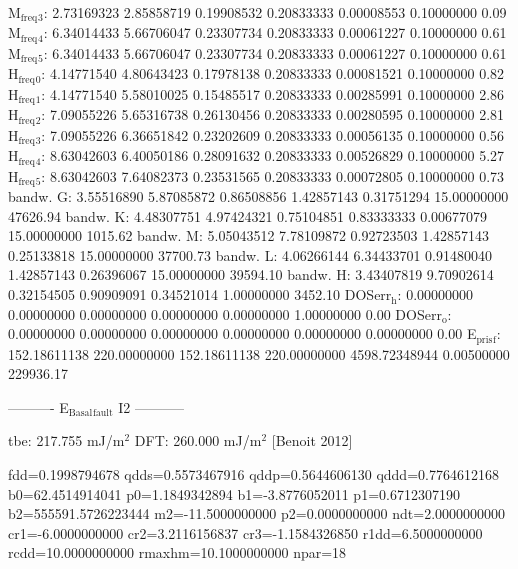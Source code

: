 \documentclass[11pt]{article}
\begin{document}
M\(_{\text{freq}}\)\(_{\text{3}}\):   2.73169323   2.85858719   0.19908532   0.20833333   0.00008553   0.10000000         0.09
M\(_{\text{freq}}\)\(_{\text{4}}\):   6.34014433   5.66706047   0.23307734   0.20833333   0.00061227   0.10000000         0.61
M\(_{\text{freq}}\)\(_{\text{5}}\):   6.34014433   5.66706047   0.23307734   0.20833333   0.00061227   0.10000000         0.61
H\(_{\text{freq}}\)\(_{\text{0}}\):   4.14771540   4.80643423   0.17978138   0.20833333   0.00081521   0.10000000         0.82
H\(_{\text{freq}}\)\(_{\text{1}}\):   4.14771540   5.58010025   0.15485517   0.20833333   0.00285991   0.10000000         2.86
H\(_{\text{freq}}\)\(_{\text{2}}\):   7.09055226   5.65316738   0.26130456   0.20833333   0.00280595   0.10000000         2.81
H\(_{\text{freq}}\)\(_{\text{3}}\):   7.09055226   6.36651842   0.23202609   0.20833333   0.00056135   0.10000000         0.56
H\(_{\text{freq}}\)\(_{\text{4}}\):   8.63042603   6.40050186   0.28091632   0.20833333   0.00526829   0.10000000         5.27
H\(_{\text{freq}}\)\(_{\text{5}}\):   8.63042603   7.64082373   0.23531565   0.20833333   0.00072805   0.10000000         0.73
bandw. G:   3.55516890   5.87085872   0.86508856   1.42857143   0.31751294  15.00000000     47626.94
bandw. K:   4.48307751   4.97424321   0.75104851   0.83333333   0.00677079  15.00000000      1015.62
bandw. M:   5.05043512   7.78109872   0.92723503   1.42857143   0.25133818  15.00000000     37700.73
bandw. L:   4.06266144   6.34433701   0.91480040   1.42857143   0.26396067  15.00000000     39594.10
bandw. H:   3.43407819   9.70902614   0.32154505   0.90909091   0.34521014   1.00000000      3452.10
DOSerr\(_{\text{h}}\):   0.00000000   0.00000000   0.00000000   0.00000000   0.00000000   1.00000000         0.00
DOSerr\(_{\text{o}}\):   0.00000000   0.00000000   0.00000000   0.00000000   0.00000000   0.00000000         0.00
E\(_{\text{pris}}\)\(_{\text{f}}\): 152.18611138 220.00000000 152.18611138 220.00000000 4598.72348944   0.00500000    229936.17

----------     E\(_{\text{Basal}}\)\(_{\text{fault}}\) I2     -----------

tbe:       217.755 mJ/m\(^{\text{2}}\)
DFT:       260.000 mJ/m\(^{\text{2}}\) [Benoit  2012]




fdd=0.1998794678 qdds=0.5573467916 qddp=0.5644606130 qddd=0.7764612168 b0=62.4514914041 p0=1.1849342894 b1=-3.8776052011 p1=0.6712307190 b2=555591.5726223444 m2=-11.5000000000 p2=0.0000000000 ndt=2.0000000000 cr1=-6.0000000000 cr2=3.2116156837 cr3=-1.1584326850 r1dd=6.5000000000 rcdd=10.0000000000 rmaxhm=10.1000000000 npar=18 
\end{document}
